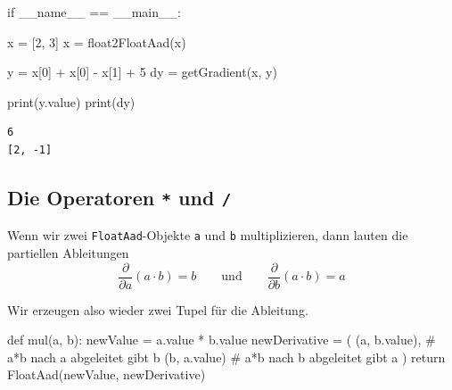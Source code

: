 \documentclass[
  a4paper,
  DIV=11]{scrreprt}
\newenvironment{Shaded}{\begin{snugshade}}{\end{snugshade}}
\newcommand{\BuiltInTok}[1]{\textcolor[rgb]{0.00,0.23,0.31}{#1}}
\newcommand{\CommentTok}[1]{\textcolor[rgb]{0.37,0.37,0.37}{#1}}
\newcommand{\ControlFlowTok}[1]{\textcolor[rgb]{0.00,0.23,0.31}{#1}}
\newcommand{\DecValTok}[1]{\textcolor[rgb]{0.68,0.00,0.00}{#1}}
\newcommand{\KeywordTok}[1]{\textcolor[rgb]{0.00,0.23,0.31}{#1}}
\newcommand{\NormalTok}[1]{\textcolor[rgb]{0.00,0.23,0.31}{#1}}
\newcommand{\OperatorTok}[1]{\textcolor[rgb]{0.37,0.37,0.37}{#1}}
\newcommand{\StringTok}[1]{\textcolor[rgb]{0.13,0.47,0.30}{#1}}
\newcommand{\VariableTok}[1]{\textcolor[rgb]{0.07,0.07,0.07}{#1}}
\theoremstyle{definition}
\theoremstyle{definition}
\theoremstyle{remark}
\begin{document}
\begin{Shaded}
\begin{Highlighting}[]
\ControlFlowTok{if} \VariableTok{\_\_name\_\_} \OperatorTok{==} \StringTok{\textquotesingle{}\_\_main\_\_\textquotesingle{}}\NormalTok{:}

\NormalTok{    x }\OperatorTok{=}\NormalTok{ [}\DecValTok{2}\NormalTok{, }\DecValTok{3}\NormalTok{]}
\NormalTok{    x }\OperatorTok{=}\NormalTok{ float2FloatAad(x)}
    
\NormalTok{    y }\OperatorTok{=}\NormalTok{ x[}\DecValTok{0}\NormalTok{] }\OperatorTok{+}\NormalTok{ x[}\DecValTok{0}\NormalTok{] }\OperatorTok{{-}}\NormalTok{ x[}\DecValTok{1}\NormalTok{] }\OperatorTok{+} \DecValTok{5}
\NormalTok{    dy }\OperatorTok{=}\NormalTok{ getGradient(x, y)}

    \BuiltInTok{print}\NormalTok{(y.value)}
    \BuiltInTok{print}\NormalTok{(dy)}
\end{Highlighting}
\end{Shaded}

\begin{verbatim}
6
[2, -1]
\end{verbatim}

\hypertarget{die-operatoren-und-1}{%
\subsection{\texorpdfstring{Die Operatoren \texttt{*} und
\texttt{/}}{Die Operatoren * und /}}\label{die-operatoren-und-1}}

Wenn wir zwei \texttt{FloatAad}-Objekte \texttt{a} und \texttt{b}
multiplizieren, dann lauten die partiellen Ableitungen \[
\frac{\partial}{\partial a}(a \cdot b)=b \qquad\textrm{und}\qquad \frac{\partial}{\partial b}(a \cdot b)=a
\]

Wir erzeugen also wieder zwei Tupel für die Ableitung.

\begin{Shaded}
\begin{Highlighting}[]
\KeywordTok{def}\NormalTok{ mul(a, b):}
\NormalTok{    newValue }\OperatorTok{=}\NormalTok{ a.value }\OperatorTok{*}\NormalTok{ b.value}
\NormalTok{    newDerivative }\OperatorTok{=}\NormalTok{ (}
\NormalTok{        (a, b.value),  }\CommentTok{\# a*b nach a abgeleitet gibt b}
\NormalTok{        (b, a.value)   }\CommentTok{\# a*b nach b abgeleitet gibt a}
\NormalTok{    )}
    \ControlFlowTok{return}\NormalTok{ FloatAad(newValue, newDerivative)}
\end{Highlighting}
\end{Shaded}
\end{document}

